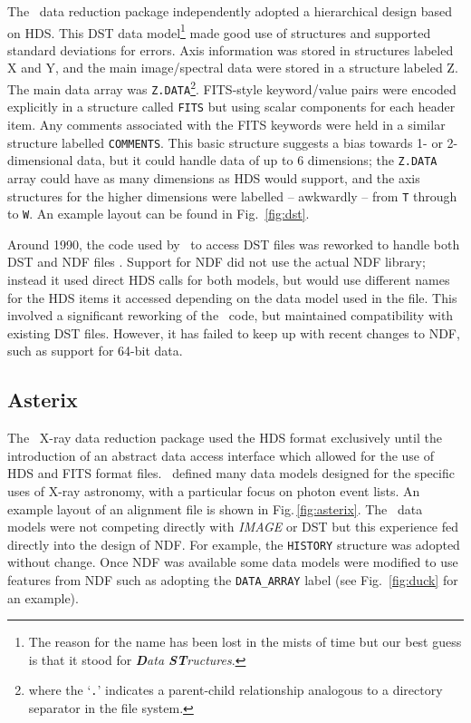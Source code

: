 \documentclass[final,authoryear,5p,times,twocolumn]{elsarticle}
\begin{document}
The \figaro\ data reduction package
\citep[][]{1988igbo.conf..448C,1993ASPC...52..219S}
independently adopted a hierarchical design based on HDS. This DST
data model\footnote{The reason for the name has been lost in the mists of
  time but our best guess is that it stood for \emph{\textbf{D}ata
    \textbf{ST}ructures}.} made good use of structures and supported
standard deviations for errors. Axis information was stored in
structures labeled X and Y, and the main image/spectral data were
stored in a structure labeled Z. The main data array was
\texttt{Z.DATA}\footnote{where the `\texttt{.}' indicates a
  parent-child relationship analogous to a directory separator in the
  file system.}. FITS-style keyword/value pairs were encoded
explicitly in a structure called \texttt{FITS} but using scalar
components for each header item. Any comments associated with the FITS
keywords were held in a similar structure labelled
\texttt{COMMENTS}. This basic structure suggests a bias towards 1- or
2-dimensional data, but it could handle data of up to 6 dimensions;
the \texttt{Z.DATA} array could have as many dimensions as HDS would
support, and the axis structures for the higher dimensions were
labelled -- awkwardly -- from \texttt{T} through to \texttt{W}. An
example layout can be found in Fig.~\ref{fig:dst}.

Around 1990, the code used by \figaro\ to access DST files was
reworked to handle both DST and NDF files
\citep{1990STARB...6...18S}. Support for NDF did
not use the actual NDF library; instead it used direct HDS calls for
both models, but would use different names for the HDS items it
accessed depending on the data model used in the file. This involved a
significant reworking of the \figaro\ code, but maintained compatibility
with existing DST files. However, it has failed to keep up with
recent changes to NDF, such as support for 64-bit data.

\subsection{Asterix}
\label{app:asterix}

The \asterix\ X-ray data reduction package
\citep[][]{1987JBIS...40..185P,SUN98,1992STARB...9....3S} used the HDS
format exclusively until the introduction of an abstract data access
interface \citep{1995ASPC...77..199A} which allowed for the use of HDS
and FITS format files. \asterix\ defined many data models designed for
the specific uses of X-ray astronomy, with a particular focus on
photon event lists. An example layout of an alignment file is shown in
Fig.\,\ref{fig:asterix}. The \asterix\ data models were not competing directly with \emph{IMAGE} or
DST but this experience fed directly into the design of NDF.
For example, the \texttt{HISTORY} structure was adopted without change. Once
NDF was available some data models were modified to use features from
NDF such as adopting the \texttt{DATA\_ARRAY} label (see
Fig.~\ref{fig:duck} for an example).
\end{document}
